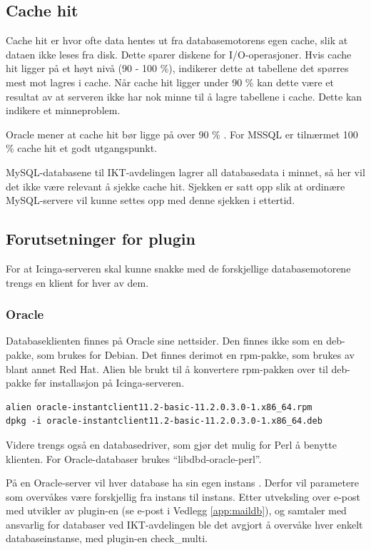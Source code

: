 \subsection*{Cache hit}
Cache hit er hvor ofte data hentes ut fra databasemotorens egen cache, slik at dataen ikke leses fra disk. Dette sparer diskene for I/O-operasjoner. Hvis cache hit ligger på et høyt nivå (90 - 100 \%), indikerer dette at tabellene det spørres mest mot lagres i cache. Når cache hit ligger under 90 \% kan dette være et resultat av at serveren ikke har nok minne til å lagre tabellene i cache. Dette kan indikere et minneproblem.

Oracle mener at cache hit bør ligge på over 90 \% \cite{oraclecachehit}. For MSSQL er tilnærmet 100 \% cache hit et godt utgangspunkt\cite{sqlmonitoring}.

MySQL-databasene til IKT-avdelingen lagrer all databasedata i minnet, så her vil det ikke være relevant å sjekke cache hit. Sjekken er satt opp slik at ordinære MySQL-servere vil kunne settes opp med denne sjekken i ettertid.

\subsection{Forutsetninger for plugin}
For at Icinga-serveren skal kunne snakke med de forskjellige databasemotorene trengs en klient for hver av dem. 

\subsubsection{Oracle}\label{sec:oracle}
Databaseklienten finnes på Oracle sine nettsider\cite{oracleclient}. Den finnes ikke som en deb-pakke, som brukes for Debian. Det finnes derimot en rpm-pakke, som brukes av blant annet Red Hat. Alien ble brukt til å konvertere rpm-pakken over til deb-pakke før installasjon på Icinga-serveren\cite{debian:alien}.

\begin{lstlisting}[style=example]
alien oracle-instantclient11.2-basic-11.2.0.3.0-1.x86_64.rpm 
dpkg -i oracle-instantclient11.2-basic-11.2.0.3.0-1.x86_64.deb
\end{lstlisting}

Videre trengs også en databasedriver, som gjør det mulig for Perl å benytte klienten. For Oracle-databaser brukes ``libdbd-oracle-perl''.

På en Oracle-server vil hver database ha sin egen instans \cite{oraclefaq}. Derfor vil parametere som overvåkes være forskjellig fra instans til instans. Etter utveksling over e-post med utvikler av plugin-en (se e-post i Vedlegg \ref{app:maildb}), og samtaler med ansvarlig for databaser ved IKT-avdelingen ble det avgjort å overvåke hver enkelt databaseinstanse, med plugin-en check\_multi.

